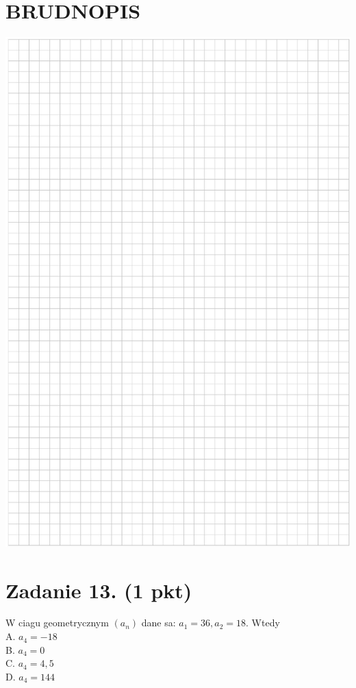 \documentclass[10pt]{article}
\begin{document}
\section*{BRUDNOPIS}
\begin{center}
\includegraphics[max width=\textwidth]{2024_11_21_6a8be49478f78d0689cfg-05}
\end{center}

\section*{Zadanie 13. (1 pkt)}
W ciagu geometrycznym \(\left(a_{n}\right)\) dane sa: \(a_{1}=36, a_{2}=18\). Wtedy\\
A. \(a_{4}=-18\)\\
B. \(a_{4}=0\)\\
C. \(a_{4}=4,5\)\\
D. \(a_{4}=144\)
\end{document}
